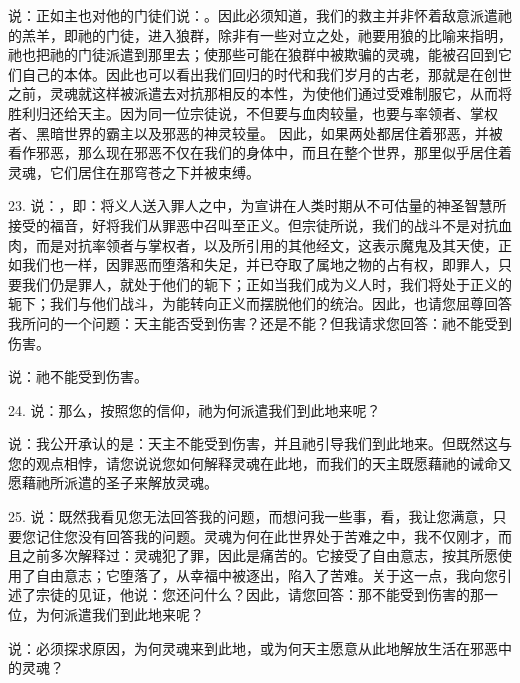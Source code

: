 说：正如主也对他的门徒们说：。因此必须知道，我们的救主并非怀着敌意派遣祂的羔羊，即祂的门徒，进入狼群，除非有一些对立之处，祂要用狼的比喻来指明，祂也把祂的门徒派遣到那里去；使那些可能在狼群中被欺骗的灵魂，能被召回到它们自己的本体。因此也可以看出我们回归的时代和我们岁月的古老，那就是在创世之前，灵魂就这样被派遣去对抗那相反的本性，为使他们通过受难制服它，从而将胜利归还给天主。因为同一位宗徒说，不但要与血肉较量，也要与率领者、掌权者、黑暗世界的霸主以及邪恶的神灵较量。 因此，如果两处都居住着邪恶，并被看作邪恶，那么现在邪恶不仅在我们的身体中，而且在整个世界，那里似乎居住着灵魂，它们居住在那穹苍之下并被束缚。\par

23. 说：，即：将义人送入罪人之中，为宣讲在人类时期从不可估量的神圣智慧所接受的福音，好将我们从罪恶中召叫至正义。但宗徒所说，我们的战斗不是对抗血肉，而是对抗率领者与掌权者，以及所引用的其他经文，这表示魔鬼及其天使，正如我们也一样，因罪恶而堕落和失足，并已夺取了属地之物的占有权，即罪人，只要我们仍是罪人，就处于他们的轭下；正如当我们成为义人时，我们将处于正义的轭下；我们与他们战斗，为能转向正义而摆脱他们的统治。因此，也请您屈尊回答我所问的一个问题：天主能否受到伤害？还是不能？但我请求您回答：祂不能受到伤害。\par

说：祂不能受到伤害。\par

24. 说：那么，按照您的信仰，祂为何派遣我们到此地来呢？\par

说：我公开承认的是：天主不能受到伤害，并且祂引导我们到此地来。但既然这与您的观点相悖，请您说说您如何解释灵魂在此地，而我们的天主既愿藉祂的诫命又愿藉祂所派遣的圣子来解放灵魂。\par

25. 说：既然我看见您无法回答我的问题，而想问我一些事，看，我让您满意，只要您记住您没有回答我的问题。灵魂为何在此世界处于苦难之中，我不仅刚才，而且之前多次解释过：灵魂犯了罪，因此是痛苦的。它接受了自由意志，按其所愿使用了自由意志；它堕落了，从幸福中被逐出，陷入了苦难。关于这一点，我向您引述了宗徒的见证，他说：您还问什么？因此，请您回答：那不能受到伤害的那一位，为何派遣我们到此地来呢？\par

说：必须探求原因，为何灵魂来到此地，或为何天主愿意从此地解放生活在邪恶中的灵魂？\par

